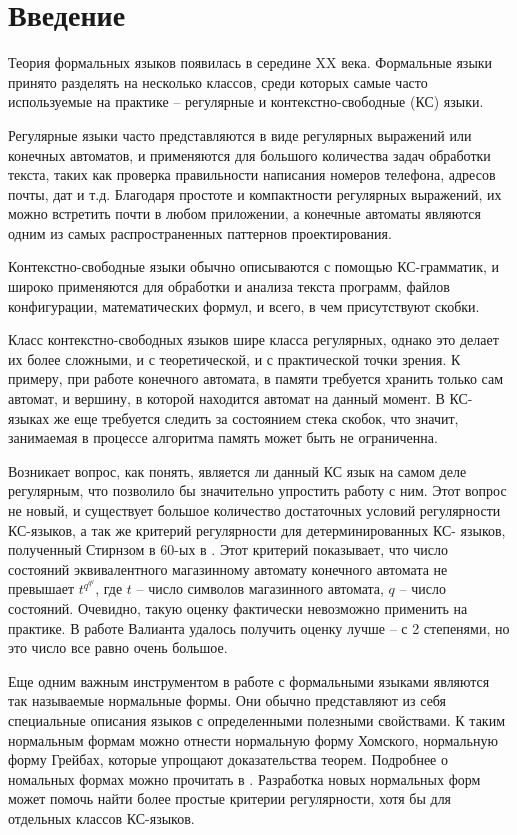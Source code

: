 \chapter{Введение} \label{chapter0}


Теория формальных языков появилась в середине XX века. 
Формальные языки принято разделять на несколько классов, среди которых самые часто используемые на практике -- 
регулярные и контекстно-свободные (КС) языки. 

Регулярные языки часто представляются в виде регулярных выражений или
конечных автоматов, и применяются для большого количества задач обработки текста, 
таких как проверка правильности написания номеров телефона, адресов почты, дат и т.д.
Благодаря простоте и компактности регулярных выражений, их можно встретить почти в любом
приложении, а конечные автоматы являются одним из самых распространенных паттернов проектирования.

Контекстно-свободные языки обычно описываются с помощью КС-грамматик,
и широко применяются для обработки и анализа текста программ, файлов конфигурации, математических
формул, и всего, в чем присутствуют скобки.

Класс контекстно-свободных языков шире класса регулярных, однако это делает их более сложными,
и с теоретической, и с практической точки зрения. К примеру, при работе конечного автомата,
в памяти требуется хранить только сам автомат, и вершину, в которой находится автомат на данный 
момент. В КС-языках же еще требуется следить за состоянием стека скобок,
что значит, занимаемая в процессе алгоритма память может быть не ограниченна. 

Возникает вопрос, как понять, является ли данный КС язык на самом деле регулярным, что позволило бы
значительно упростить работу с ним. Этот вопрос не новый, и существует большое количество
достаточных условий регулярности КС-языков, а так же критерий регулярности для детерминированных КС-
языков, полученный Стирнзом в 60-ых в \cite{STEARNS1967323}. Этот критерий показывает, что число состояний эквивалентного
магазинному автомату конечного автомата не превышает $t^{q^{q^{q}}}$,
где $t$ -- число символов магазинного автомата, $q$ -- число состояний.
Очевидно, такую оценку фактически невозможно применить на практике.
В работе Валианта \cite{Valiant1975RegularityAR} удалось получить оценку лучше -- с 2 степенями, 
но это число все равно очень большое. 

Еще одним важным инструментом в работе с формальными языками являются так называемые нормальные формы.
Они обычно представляют из себя специальные описания языков с определенными полезными свойствами.
К таким нормальным формам можно отнести нормальную форму Хомского, нормальную форму Грейбах,
которые упрощают доказательства теорем. Подробнее о номальных формах можно прочитать в \cite{handbook_of_formal}.
Разработка новых нормальных форм может помочь найти более простые критерии регулярности, хотя бы для
отдельных классов КС-языков.

